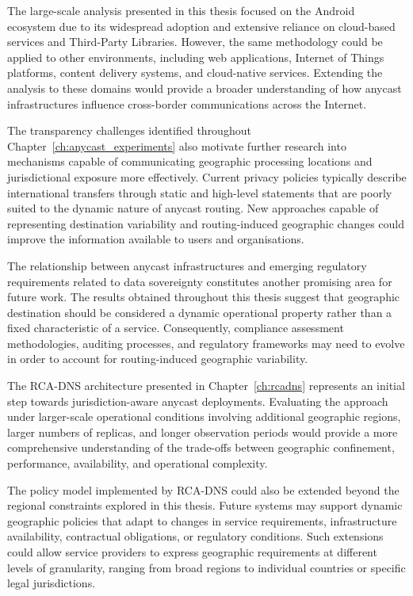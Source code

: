 The large-scale analysis presented in this thesis focused on the Android ecosystem due to its widespread adoption and extensive reliance on cloud-based services and Third-Party Libraries. However, the same methodology could be applied to other environments, including web applications, Internet of Things platforms, content delivery systems, and cloud-native services. Extending the analysis to these domains would provide a broader understanding of how anycast infrastructures influence cross-border communications across the Internet.

The transparency challenges identified throughout Chapter~\ref{ch:anycast_experiments} also motivate further research into mechanisms capable of communicating geographic processing locations and jurisdictional exposure more effectively. Current privacy policies typically describe international transfers through static and high-level statements that are poorly suited to the dynamic nature of anycast routing. New approaches capable of representing destination variability and routing-induced geographic changes could improve the information available to users and organisations.

The relationship between anycast infrastructures and emerging regulatory requirements related to data sovereignty constitutes another promising area for future work. The results obtained throughout this thesis suggest that geographic destination should be considered a dynamic operational property rather than a fixed characteristic of a service. Consequently, compliance assessment methodologies, auditing processes, and regulatory frameworks may need to evolve in order to account for routing-induced geographic variability.

The RCA-DNS architecture presented in Chapter~\ref{ch:rcadns} represents an initial step towards jurisdiction-aware anycast deployments. Evaluating the approach under larger-scale operational conditions involving additional geographic regions, larger numbers of replicas, and longer observation periods would provide a more comprehensive understanding of the trade-offs between geographic confinement, performance, availability, and operational complexity.

The policy model implemented by RCA-DNS could also be extended beyond the regional constraints explored in this thesis. Future systems may support dynamic geographic policies that adapt to changes in service requirements, infrastructure availability, contractual obligations, or regulatory conditions. Such extensions could allow service providers to express geographic requirements at different levels of granularity, ranging from broad regions to individual countries or specific legal jurisdictions.

